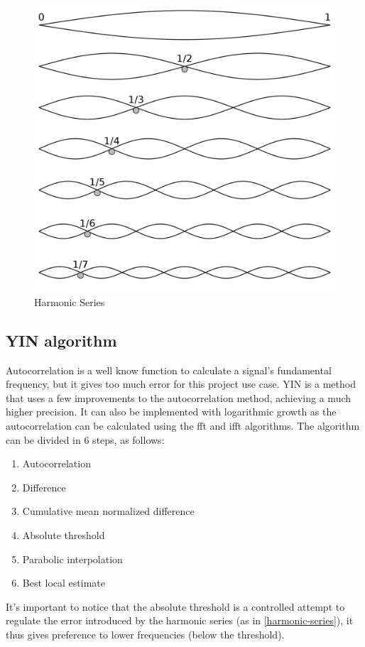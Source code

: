 \begin{figure}[htb]
	\caption{Harmonic Series}
  \label{harmonic-series}
	\begin{center}
    \includegraphics[scale=0.15]{images/harmonic-series.png}
	\end{center}
\end{figure}

\subsection{YIN algorithm}
Autocorrelation is a well know function to calculate a signal's fundamental
frequency, but it gives too much error for this project use case. YIN \cite{YINArticle}
is a method that uses a few improvements to the autocorrelation method, achieving
a much higher precision. It can also be implemented with logarithmic growth as the
autocorrelation can be calculated using the fft and ifft algorithms. The algorithm
can be divided in 6 steps, as follows:
\begin{enumerate}
  \item Autocorrelation
  \item Difference
  \item Cumulative mean normalized difference
  \item Absolute threshold
  \item Parabolic interpolation
  \item Best local estimate
\end{enumerate}
It's important to notice that the absolute threshold is a controlled attempt to regulate
the error introduced by the harmonic series (as in \autoref{harmonic-series}),
it thus gives preference to lower frequencies (below the threshold).

